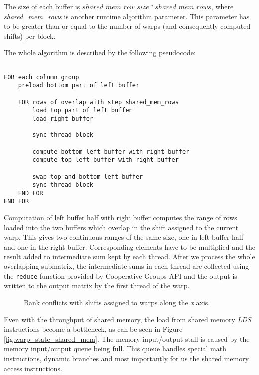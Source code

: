The size of each buffer is $shared\_mem\_row\_size * shared\_mem\_rows$, where \textit{shared\_mem\_rows} is another runtime algorithm parameter. This parameter has to be greater than or equal to the number of warps (and consequently computed shifts) per block.

The whole algorithm is described by the following pseudocode:
\begin{lstlisting}[]

FOR each column group
	preload bottom part of left buffer

	FOR rows of overlap with step shared_mem_rows
		load top part of left buffer
		load right buffer

		sync thread block

		compute bottom left buffer with right buffer
		compute top left buffer with right buffer

		swap top and bottom left buffer
		sync thread block
	END FOR
END FOR

\end{lstlisting}

Computation of left buffer half with right buffer computes the range of rows loaded into the two buffers which overlap in the shift assigned to the current warp. This gives two continuous ranges of the same size, one in left buffer half and one in the right buffer. Corresponding elements have to be multiplied and the result added to intermediate sum kept by each thread. After we process the whole overlapping submatrix, the intermediate sums in each thread are collected using the \texttt{reduce} function provided by Cooperative Groups API and the output is written to the output matrix by the first thread of the warp.


\begin{figure}[ht]
	\centering
	\def\svgwidth{0.5\textwidth}
	
	\caption{Bank conflicts with shifts assigned to warps along the \textit{x} axis.}
	\label{fig:warp_per_shift_shared_mem_overlaps_in_x}
\end{figure}


Even with the throughput of shared memory, the load from shared memory \textit{LDS} instructions become a bottleneck, as can be seen in Figure \ref{fig:warp_state_shared_mem}. The memory input/output stall is caused by the memory input/output queue being full. This queue handles special math instructions, dynamic branches and most importantly for us the shared memory access instructions.

